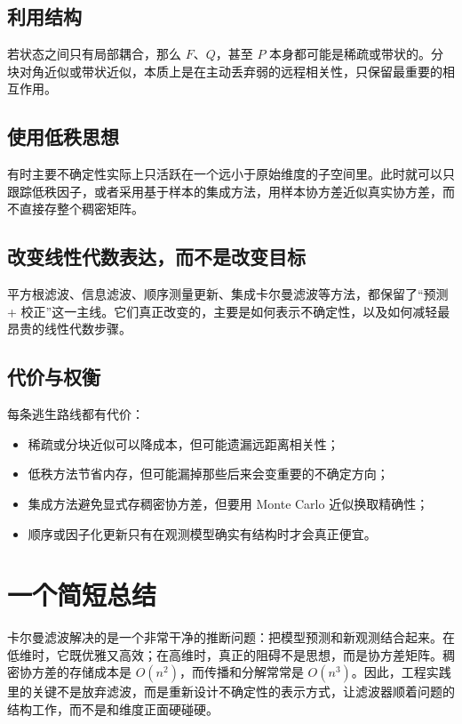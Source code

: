 \documentclass[12pt,a4paper]{ctexart}
\begin{document}
\subsection{利用结构}

若状态之间只有局部耦合，那么 \(F\)、\(Q\)，甚至 \(P\) 本身都可能是稀疏或带状的。分块对角近似或带状近似，本质上是在主动丢弃弱的远程相关性，只保留最重要的相互作用。

\subsection{使用低秩思想}

有时主要不确定性实际上只活跃在一个远小于原始维度的子空间里。此时就可以只跟踪低秩因子，或者采用基于样本的集成方法，用样本协方差近似真实协方差，而不直接存整个稠密矩阵。

\subsection{改变线性代数表达，而不是改变目标}

平方根滤波、信息滤波、顺序测量更新、集成卡尔曼滤波等方法，都保留了“预测 + 校正”这一主线。它们真正改变的，主要是如何表示不确定性，以及如何减轻最昂贵的线性代数步骤。

\subsection{代价与权衡}

每条逃生路线都有代价：
\begin{itemize}
  \item 稀疏或分块近似可以降成本，但可能遗漏远距离相关性；
  \item 低秩方法节省内存，但可能漏掉那些后来会变重要的不确定方向；
  \item 集成方法避免显式存稠密协方差，但要用 Monte Carlo 近似换取精确性；
  \item 顺序或因子化更新只有在观测模型确实有结构时才会真正便宜。
\end{itemize}


\section{一个简短总结}

卡尔曼滤波解决的是一个非常干净的推断问题：把模型预测和新观测结合起来。在低维时，它既优雅又高效；在高维时，真正的阻碍不是思想，而是协方差矩阵。稠密协方差的存储成本是 \(O(n^2)\)，而传播和分解常常是 \(O(n^3)\)。因此，工程实践里的关键不是放弃滤波，而是重新设计不确定性的表示方式，让滤波器顺着问题的结构工作，而不是和维度正面硬碰硬。
\end{document}
